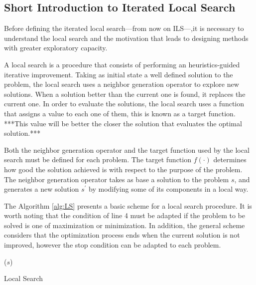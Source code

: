 \documentclass[review]{elsarticle}
\begin{document}
\subsection{Short Introduction to Iterated Local Search}

Before defining the iterated local search---from now on ILS---,it is necessary to understand the local search and the motivation that leads to designing methods with greater exploratory capacity.

A local search is a procedure that consists of performing an heuristics-guided iterative improvement. Taking as initial state a well defined solution to the problem, the local search uses a neighbor generation operator to explore new solutions. When a solution better than the current one is found, it replaces the current one. In order to evaluate the solutions, the local search uses a function that assigns a value to each one of them, this is known as a target function. ***This value will be better the closer the solution that evaluates the optimal solution.*** 

Both the neighbor generation operator and the target function used by the local search must be defined for each problem. The target function $f(\cdot)$ determines how good the solution achieved is with respect to the purpose of the problem. The neighbor generation operator takes as base a solution to the problem $s$, and generates a new solution $s^\prime$ by modifying some of its components in a local way.

The Algorithm \ref{alg:LS} presents a basic scheme for a local search procedure. It is worth noting that the condition of line 4 must be adapted if the problem to be solved is one of maximization or minimization. In addition, the general scheme considers that the optimization process ends when the current solution is not improved, however the stop condition can be adapted to each problem.

\begin{algorithm}
	\SetNlSkip{0.5em}
	\BlankLine
	\BlankLine
	\KwRet ($s$)
	
	\caption{Local Search}\label{alg:LS}
\end{algorithm}
\end{document}
